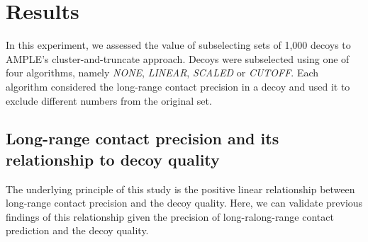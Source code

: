 %
%

\section{Results}

In this experiment, we assessed the value of subselecting sets of 1,000 decoys to AMPLE's cluster-and-truncate approach. Decoys were subselected using one of four algorithms, namely \textit{NONE}, \textit{LINEAR}, \textit{SCALED} or \textit{CUTOFF}. Each algorithm considered the long-range contact precision in a decoy and used it to exclude different numbers from the original set.

\subsection{Long-range contact precision and its relationship to decoy quality}

The underlying principle of this study is the positive linear relationship between long-range contact precision and the decoy quality. Here, we can validate previous findings of this relationship \cite{} given the precision of long-ralong-range contact prediction and the decoy quality.

